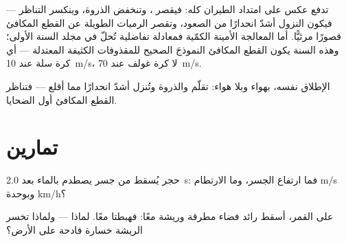 \begin{remark}\label{rem:g12:projectile-motion:drag}
تدفع  عكس  على امتداد الطيران كله: فيقصر ،
وتنخفض الذروة، وينكسر التناظر --- فيكون النزول أشدّ انحدارًا من
الصعود، وتقصر الرميات الطويلة عن القطع المكافئ قصورًا مرئيًّا. أما المعالجة الأمينة
الكمّية فمعادلة تفاضلية تُحلّ في مجلد السنة الأولى؛ وهذه
السنة يكون القطع المكافئ النموذجَ الصحيح للمقذوفات الكثيفة المعتدلة
 --- أي كرة سلة عند \qty{10}{m/s}، لا كرة غولف عند
\qty{70}{m/s}.
\end{remark}

\begin{omfigure}

{\small الإطلاق نفسه، بهواء وبلا هواء: تقلّم   والذروة
وتُنزل  أشدّ انحدارًا مما أقلع --- فتناظر القطع المكافئ
أول الضحايا.}
\end{omfigure}

\section{تمارين}

\begin{exercise}[$\star$]\label{exo:g12:projectile-motion:1}
حجر يُسقط من جسر يصطدم بالماء بعد \qty{2.0}{s}: فما ارتفاع
الجسر، وما  الارتطام  \unit{m/s} وبوحدة \unit{km/h}؟
\end{exercise}

\begin{exercise}[$\star$]\label{exo:g12:projectile-motion:2}
على القمر، أسقط رائد فضاء مطرقة وريشة معًا: فهبطتا
معًا. لماذا --- ولماذا تخسر الريشة خسارة فادحة على الأرض؟
\end{exercise}

